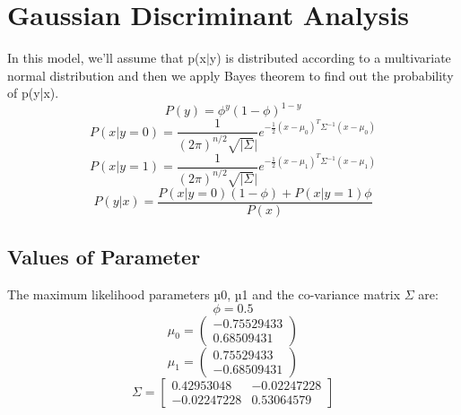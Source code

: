 \documentclass[12pt]{article}
\begin{document}
\section{Gaussian Discriminant Analysis}
In this model, we’ll assume that p(x$|$y) is distributed
according to a multivariate normal distribution and then we apply Bayes theorem to find out the probability of p(y|x).
\begin{equation}
P(y) = \phi^y(1-\phi)^{1-y}
\end{equation}
\begin{equation}
P(x | y = 0) = \frac{1}{(2\pi)^{n/2}\sqrt{|\Sigma}|} e^{-\frac{1}{2}(x-\mu_0)^T\Sigma^{-1} (x-\mu_0)}
\end{equation}
\begin{equation}
P(x | y = 1) = \frac{1}{(2\pi)^{n/2}\sqrt{|\Sigma}|} e^{-\frac{1}{2}(x-\mu_1)^T\Sigma^{-1} (x-\mu_1)}
\end{equation}
\begin{equation}
P(y | x) = \frac{P(x | y=0) (1-\phi) + P(x | y=1) \phi}{P(x)}
\end{equation}
\subsection{Values of Parameter} The maximum likelihood parameters µ0, µ1 and the co-variance matrix $\Sigma$ are:
\begin{equation}
    \phi=0.5
\end{equation}
\begin{equation}
    \mu_{0} =
    \begin{pmatrix}
        -0.75529433\\
        0.68509431
    \end{pmatrix}
\end{equation}
\begin{equation}
    \mu_{1} =
    \begin{pmatrix}
        0.75529433\\
        -0.68509431
    \end{pmatrix}
\end{equation}
\begin{equation}
    \Sigma=\left[\begin{array}{cc}
        0.42953048 & -0.02247228 \\
        -0.02247228 & 0.53064579
    \end{array}\right]
\end{equation}
\end{document}
